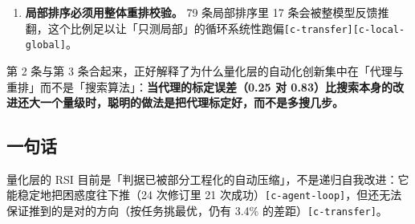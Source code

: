 \begin{enumerate}
  \item \textbf{局部排序必须用整体重排校验。} 79 条局部排序里 17 条会被整模型反馈推翻，这个比例足以让「只测局部」的循环系统性跑偏{\scriptsize\texttt{[c-\hspace{0pt}transfer]}}{\scriptsize\texttt{[c-\hspace{0pt}local-\hspace{0pt}global]}}。
\end{enumerate}

第 2 条与第 3 条合起来，正好解释了为什么量化层的自动化创新集中在「代理与重排」而不是「搜索算法」：\textbf{当代理的标定误差（0.25 对 0.83）比搜索本身的改进还大一个量级时，聪明的做法是把代理标定好，而不是多搜几步。}


\subsection{一句话}

量化层的 RSI 目前是「判据已被部分工程化的自动压缩」，不是递归自我改进：它能稳定地把困惑度往下推（24 次修订里 21 次成功）{\scriptsize\texttt{[c-\hspace{0pt}agent-\hspace{0pt}loop]}}，但还无法保证推到的是对的方向（按任务挑最优，仍有 3.4\% 的差距）{\scriptsize\texttt{[c-\hspace{0pt}transfer]}}。
